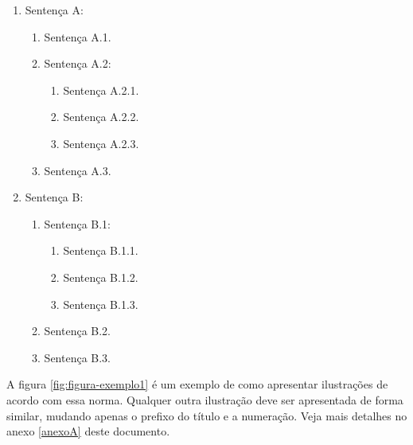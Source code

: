 \documentclass[
	12pt,				%
	oneside,			%
	a4paper,			%
	english,			%
	brazil				%
	]{abntex2ppgsi}
\begin{document}
\begin{enumerate}
	\item Sentença A:
  \begin{enumerate}
	  \item Sentença A.1.
	  \item Sentença A.2:
    \begin{enumerate}
	    \item Sentença A.2.1.
	    \item Sentença A.2.2.
	    \item Sentença A.2.3.
    \end{enumerate}
	  \item Sentença A.3.
	\end{enumerate}
  \item Sentença B:
  \begin{enumerate}
	  \item Sentença B.1:
      \begin{enumerate}
  	    \item Sentença B.1.1.
  	    \item Sentença B.1.2.
  	    \item Sentença B.1.3.
      \end{enumerate}
	  \item Sentença B.2.
	  \item Sentença B.3.
  \end{enumerate}
\end{enumerate}

A figura \ref{fig:figura-exemplo1} é um exemplo de como apresentar ilustrações de acordo com essa norma. Qualquer outra ilustração deve ser apresentada de forma similar, mudando apenas o prefixo do título e a numeração. Veja mais detalhes no anexo \ref{anexoA} deste documento.
\end{document}
